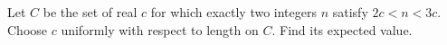 Let $C$ be the set of real $c$ for which exactly two integers $n$ satisfy $2c<n<3c$. Choose $c$ uniformly with respect to length on $C$. Find its expected value.
